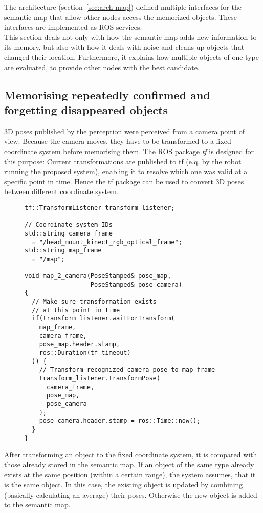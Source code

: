 The architecture (section~\ref{sec:arch-map}) defined multiple interfaces for the semantic map that allow other nodes access the memorized objects. These interfaces are implemented as ROS services. \\

This section deals not only with how the semantic map adds new information to its memory, but also with how it deals with noise and cleans up objects that changed their location. Furthermore, it explains how multiple objects of one type are evaluated, to provide other nodes with the best candidate.

\subsection{Memorising repeatedly confirmed and forgetting disappeared objects}
\label{sec:impl-memo}
3D poses published by the perception were perceived from a camera point of view. Because the camera moves, they have to be transformed to a fixed coordinate system before memorising them. The ROS package \textit{tf} is designed for this purpose: Current transformations are published to tf (e.q. by the robot running the proposed system), enabling it to resolve which one was valid at a specific point in time. Hence the tf package can be used to convert 3D poses between different coordinate system.

\begin{figure}[H]
  \begin{lstlisting}[caption=An example that shows how to use tf to transform a pose from one coordinate system to another.]
tf::TransformListener transform_listener;

// Coordinate system IDs
std::string camera_frame
  = "/head_mount_kinect_rgb_optical_frame";
std::string map_frame
  = "/map";

void map_2_camera(PoseStamped& pose_map,
                  PoseStamped& pose_camera)
{
  // Make sure transformation exists
  // at this point in time
  if(transform_listener.waitForTransform(
    map_frame,
    camera_frame,
    pose_map.header.stamp,
    ros::Duration(tf_timeout)
  )) {
    // Transform recognized camera pose to map frame
    transform_listener.transformPose(
      camera_frame,
      pose_map,
      pose_camera
    );
    pose_camera.header.stamp = ros::Time::now();
  }
}
  \end{lstlisting}
\end{figure}

After transforming an object to the fixed coordinate system, it is compared with those already stored in the semantic map. If an object of the same type already exists at the same position (within a certain range), the system assumes, that it is the same object. In this case, the existing object is updated by combining (basically calculating an average) their poses. Otherwise the new object is added to the semantic map.

